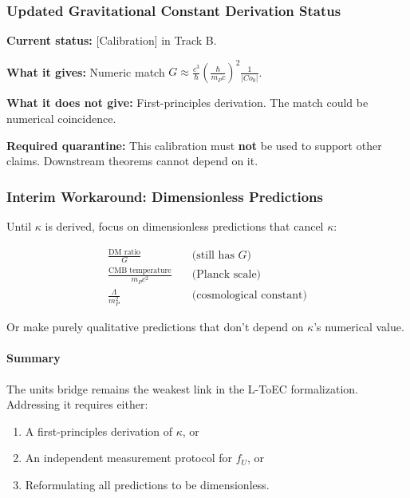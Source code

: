 \documentclass[11pt,titlepage]{article}
\begin{document}
\subsubsection{Updated Gravitational Constant Derivation Status}

\begin{tcolorbox}[colback=blue!5!white,colframe=blue!75!black,title=Status: $G$ from $|Co_0|$]
\textbf{Current status:} [Calibration] in Track B.

\textbf{What it gives:} Numeric match $G \approx \frac{c^3}{\hbar} \left(\frac{\hbar}{m_P c}\right)^2 \frac{1}{|Co_0|}$.

\textbf{What it does not give:} First-principles derivation. The match could be numerical coincidence.

\textbf{Required quarantine:} This calibration must \textbf{not} be used to support other claims. Downstream theorems cannot depend on it.
\end{tcolorbox}

\subsubsection{Interim Workaround: Dimensionless Predictions}
Until $\kappa$ is derived, focus on dimensionless predictions that cancel $\kappa$:

\begin{align*}
\frac{\text{DM ratio}}{G} &\quad\text{(still has $G$)} \\
\frac{\text{CMB temperature}}{m_P c^2} &\quad\text{(Planck scale)} \\
\frac{\Lambda}{m_P^2} &\quad\text{(cosmological constant)}
\end{align*}

Or make purely qualitative predictions that don't depend on $\kappa$'s numerical value.

\paragraph{Summary}
The units bridge remains the weakest link in the L-ToEC formalization. Addressing it requires either:
\begin{enumerate}
\item A first-principles derivation of $\kappa$, or
\item An independent measurement protocol for $f_U$, or
\item Reformulating all predictions to be dimensionless.
\end{enumerate}
\end{document}
